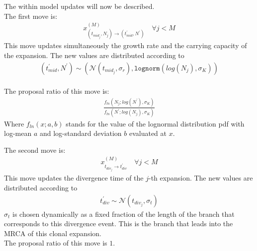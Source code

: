 \documentclass{report}
\theoremstyle{definition}
\begin{document}
The within model updates will now be described.\\
The first move is:
\begin{gather}
x^{(M)}_{\left(t_{mid_j},N_j\right)\to \left(t_{mid}^{'},N^{'}\right)}\quad\forall j < M
\end{gather}
This move updates simultaneously the growth rate and the carrying capacity of the expansion. The new values are distributed according to
\begin{gather}
\left(t_{mid}^{'},N^{'}\right)\sim\left(\mathcal{N}(t_{mid_j}, \sigma_r), \texttt{lognorm}(log(N_j), \sigma_K)\right) 
\end{gather}\\
The proposal ratio of this move is:
\begin{gather}
\frac{f_{ln}(N_j;log(N^{'}), \sigma_K)}{f_{ln}(N^{'};log(N_j), \sigma_K)}
\end{gather}
Where $f_{ln}(x; a, b)$ stands for the value of the lognormal distribution pdf with log-mean $a$ and log-standard deviation $b$ evaluated at $x$.

The second move is:
\begin{gather}
x^{(M)}_{t_{div_j}\to t_{div}^{'}}\quad\forall j < M
\end{gather} 
This move updates the divergence time of the $j$-th expansion. The new values are distributed according to
\begin{gather}
t_{div}^{'}\sim\mathcal{N}(t_{div_j}, \sigma_t)
\end{gather}
$\sigma_t$ is chosen dynamically as a fixed fraction of the length of the branch that corresponds to this divergence event. This is the branch that leads into the MRCA of this clonal expansion.\\
The proposal ratio of this move is $1$.
\end{document}
